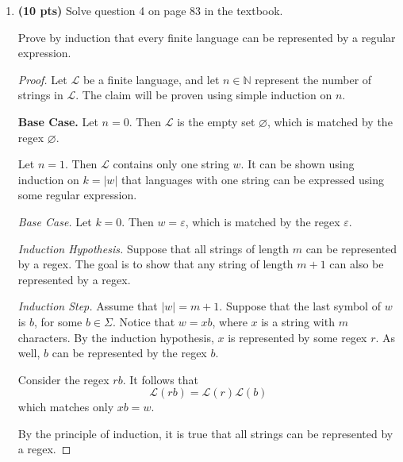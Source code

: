 \documentclass[11pt]{article}
\begin{document}
\begin{enumerate}[label=\textbf{Q\arabic*.}]
\begin{enumerate}[label=\textit{\alph*)}]
\begin{proof}
	These state invariants will be proven to hold using induction.
	
	\medskip

	\textbf{Base Case.} It is obvious that \(P_{\varepsilon}(\varepsilon)\) is true.

	\textbf{Induction Hypothesis.} For some string \(x\) of length less than or equal to \(k\), let \(q_x \in Q\). Let \(w \in \Sigma ^*\) and \(z \in \Sigma\). Suppose that \(P_{q_x}(w)\) holds true, that is, the \(k\) last characters of \(w\) end in \(x\).
\end{proof}
\end{enumerate}

\item \textbf{(10 pts)} Solve question 4 on page 83 in the textbook.

Prove by induction that every finite language can be represented by a regular expression.
\begin{proof}
	Let \(\mathcal{L}\) be a finite language, and let \(n \in \mathbb{N}\) represent the number of strings in \(\mathcal{L}\). The claim will be proven using simple induction on \(n\).

	\textbf{Base Case.} Let \(n = 0\). Then \(\mathcal{L}\) is the empty set \(\varnothing\), which is matched by the regex \(\varnothing\).

	Let \(n=1\). Then \(\mathcal{L}\) contains only one string \(w\). It can be shown using induction on \(k=|w|\) that languages with one string can be expressed using some regular expression.

	\textit{Base Case.} Let \(k=0\). Then \(w = \varepsilon\), which is matched by the regex \(\varepsilon\).

	\textit{Induction Hypothesis.} Suppose that all strings of length \(m\) can be represented by a regex. The goal is to show that any string of length \(m+1\) can also be represented by a regex.

	\textit{Induction Step.} Assume that \(|w| = m+1\). Suppose that the last symbol of \(w\) is \(b\), for some \(b \in \Sigma\). Notice that \(w = xb\), where \(x\) is a string with \(m\) characters. By the induction hypothesis, \(x\) is represented by some regex \(r\). As well, \(b\) can be represented by the regex \(b\).

	Consider the regex \(rb\). It follows that
	\[
		\mathcal{L} (rb) = \mathcal{L} (r) \mathcal{L} (b)
	\]
	which matches only \(xb = w\).

	By the principle of induction, it is true that all strings can be represented by a regex.


\end{proof}
\end{enumerate}
\end{document}
